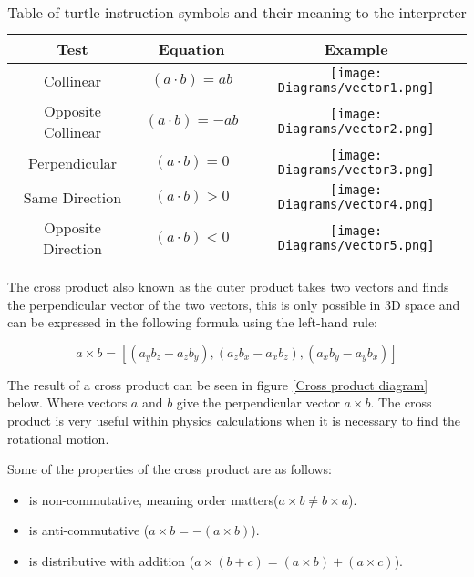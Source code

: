 \begin{table}[h!]
\centering
\begin{tabular}{ | c | c | c |}
\hline
	Test 	& Equation & Example\\  
\hline
\hline
	Collinear 							& $(a \cdot b) = ab$ & \texttt{[image: Diagrams/vector1.png]}\\
\hline
	Opposite Collinear 					& $(a \cdot b) = -ab$ &	\texttt{[image: Diagrams/vector2.png]}\\
\hline
	Perpendicular 						& $(a \cdot b) = 0$	&\texttt{[image: Diagrams/vector3.png]}\\
\hline
	Same Direction 						& $(a \cdot b) > 0$ &\texttt{[image: Diagrams/vector4.png]}\\
\hline
	Opposite Direction 					& $(a \cdot b) < 0$ &\texttt{[image: Diagrams/vector5.png]}\\
\hline

\end{tabular}
\caption{Table of turtle instruction symbols and their meaning to the interpreter}
\label{dot product test}
\end{table}
\FloatBarrier

\noindent
The cross product also known as the outer product takes two vectors and finds the perpendicular vector of the two vectors, this is only possible in 3D space and can be expressed in the following formula using the left-hand rule: 

\begin{equation}
a \times b = [(a_y b_z - a_z b_y), (a_z b_x - a_x b_z), (a_x b_y - a_y b_x)]
\end{equation}

\noindent
The result of a cross product can be seen in figure \ref{Cross product diagram} below. Where vectors $a$ and $b$ give the perpendicular vector $a \times b$. The cross product is very useful within physics calculations when it is necessary to find the rotational motion. 

\noindent
Some of the properties of the cross product are as follows:

\begin{itemize}
	\item is non-commutative, meaning order matters($a \times b \not= b \times a$).
	\item is anti-commutative ($a \times b = -(a \times b)$).
	\item is distributive with addition ($a \times (b + c) = (a \times b) + (a \times c)$).
\end{itemize}

